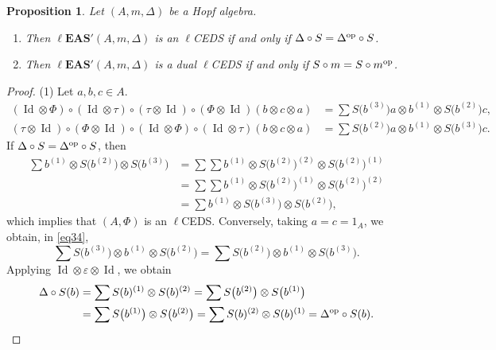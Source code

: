 \documentclass[10pt,a4paper]{amsart}
\numberwithin{equation}{section}
\newtheorem{Proposition}[Theorem]{Proposition}
 { \theoremstyle{definition}
\newtheorem{Definition}[Theorem]{Definition}
\newtheorem{Note}[Theorem]{Note}
\newtheorem{Example}[Theorem]{Example}
\newtheorem{Remark}[Theorem]{Remark}
\newtheorem{Notation}[Theorem]{Notation}}
\newcommand{\leas}{\ell\mathbf{EAS}}
\begin{document}
\begin{Proposition}
Let $(A,m,\Delta)$ be a Hopf algebra.
\begin{enumerate}\itemsep=0pt
\item[$(1)$] Then $\leas'(A,m,\Delta)$ is an $\ell$CEDS if and only if $\Delta \circ S=\Delta^{\rm op}\circ S$.
\item[$(2)$] Then $\leas'(A,m,\Delta)$ is a dual $\ell$CEDS if and only if $S\circ m=S\circ m^{\rm op}$.
\end{enumerate}
\end{Proposition}

\begin{proof}
(1) Let $a,b,c\in A$.
\begin{align}
\label{eq34} (\operatorname{Id} \otimes \Phi)\circ (\operatorname{Id} \otimes \tau)\circ (\tau \otimes \operatorname{Id})\circ (\Phi\otimes \operatorname{Id})(b\otimes c\otimes a)&=\sum S\bigl(b^{(3)}\bigr)a\otimes b^{(1)}\otimes S\bigl(b^{(2)}\bigr)c,\\
\nonumber (\tau \otimes \operatorname{Id})\circ (\Phi\otimes \operatorname{Id})\circ (\operatorname{Id} \otimes \Phi)\circ (\operatorname{Id} \otimes \tau)(b\otimes c\otimes a)&=\sum S\bigl(b^{(2)}\bigr)a\otimes b^{(1)}\otimes S\bigl(b^{(3)}\bigr)c.
\end{align}
If $\Delta \circ S=\Delta^{\rm op}\circ S$, then
\begin{align*}
\sum b^{(1)}\otimes S\bigl(b^{(2)}\bigr)\otimes S\bigl(b^{(3)}\bigr)&=\sum \sum b^{(1)}\otimes S\bigl(b^{(2)}\bigr)^{(2)} \otimes S\bigl(b^{(2)}\bigr)^{(1)}\\
&=\sum \sum b^{(1)}\otimes S\bigl(b^{(2)}\bigr)^{(1)} \otimes S\bigl(b^{(2)}\bigr)^{(2)}\\
&=\sum b^{(1)}\otimes S\bigl(b^{(3)}\bigr)\otimes S\bigl(b^{(2)}\bigr),
\end{align*}
which implies that $(A,\Phi)$ is an $\ell$CEDS. Conversely, taking $a=c=1_A$, we obtain, in \eqref{eq34},
\[\sum S\bigl(b^{(3)}\bigr)\otimes b^{(1)}\otimes S\bigl(b^{(2)}\bigr)=\sum S\bigl(b^{(2)}\bigr)\otimes b^{(1)}\otimes S\bigl(b^{(3)}\bigr).\]
Applying $\operatorname{Id} \otimes \varepsilon \otimes \operatorname{Id}$, we obtain
\begin{align*}
\Delta \circ S(b)&=\sum S(b)^{(1)}\otimes S(b)^{(2)}=\sum S\bigl(b^{(2)}\bigr)\otimes S\bigl(b^{(1)}\bigr)\\
&=\sum S\bigl(b^{(1)}\bigr)\otimes S\bigl(b^{(2)}\bigr)=\sum S(b)^{(2)}\otimes S(b)^{(1)}=\Delta^{\rm op}\circ S(b).
\end{align*}


\end{proof}
\end{document}

